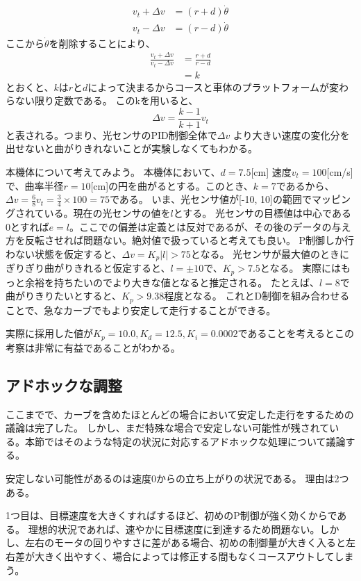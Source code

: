 \documentclass{ltjsreport}
\begin{document}
\begin{align}
  v_t + \Delta v &= (r+d)\dot{\theta}\\
  v_t - \Delta v &= (r-d)\dot{\theta}
\end{align}
ここから$\dot{\theta}$を削除することにより、
\begin{align}
  \frac{v_t+ \Delta v}{v_t-\Delta v} &= \frac{r+d}{r-d}\\
                                    &= k
\end{align}
とおくと、$k$は$r$と$d$によって決まるからコースと車体のプラットフォームが変わらない限り定数である。
このkを用いると、
\[
  \Delta v = \frac{k-1}{k+1}v_t
\]
と表される。つまり、光センサのPID制御全体で$\Delta v$ より大きい速度の変化分を出せないと曲がりきれないことが実験しなくてもわかる。

本機体について考えてみよう。
本機体において、$d=7.5$[cm]
速度$v_t =100$[cm/s]で、曲率半径$r=10$[cm]の円を曲がるとする。このとき、$k = 7$であるから、
$\Delta v = \frac{6}{8}v_t = \frac{3}{4}\times 100 = 75$である。
いま、光センサ値が[-10, 10]の範囲でマッピングされている。現在の光センサの値を$l$とする。
光センサの目標値は中心である0とすれば$e=l$。ここでの偏差は定義とは反対であるが、その後のデータの与え方を反転させれば問題ない。絶対値で扱っていると考えても良い。
P制御しか行わない状態を仮定すると、$\Delta v = K_p |l| > 75$となる。
光センサが最大値のときにぎりぎり曲がりきれると仮定すると、$l=\pm 10$で、$K_p > 7.5$となる。
実際にはもっと余裕を持ちたいのでより大きな値となると推定される。
たとえば、$l=8$で曲がりきりたいとすると、$K_p > 9.38$程度となる。
これとD制御を組み合わせることで、急なカーブでもより安定して走行することができる。

実際に採用した値が$K_p=10.0, K_d = 12.5, K_i = 0.0002$であることを考えるとこの考察は非常に有益であることがわかる。



\subsection{アドホックな調整}
ここまでで、カーブを含めたほとんどの場合において安定した走行をするための議論は完了した。
しかし、まだ特殊な場合で安定しない可能性が残されている。本節ではそのような特定の状況に対応するアドホックな処理について議論する。

安定しない可能性があるのは速度0からの立ち上がりの状況である。
理由は2つある。

1つ目は、目標速度を大きくすればするほど、初めのP制御が強く効くからである。
理想的状況であれば、速やかに目標速度に到達するため問題ない。しかし、左右のモータの回りやすさに差がある場合、初めの制御量が大きく入ると左右差が大きく出やすく、場合によっては修正する間もなくコースアウトしてしまう。
\end{document}
